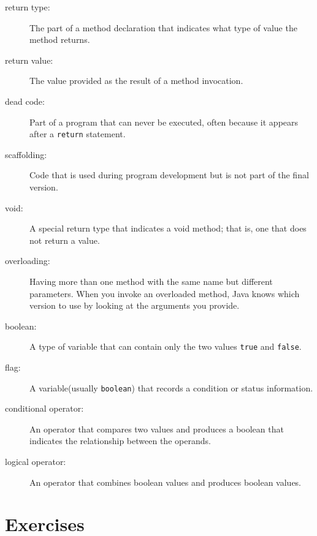 \documentclass[12pt]{book}
\theoremstyle{definition}
\begin{document}
\begin{description}

\item[return type:]  The part of a method declaration that indicates
what type of value the method returns.

\item[return value:]  The value provided as the result of a method
invocation.

\item[dead code:]  Part of a program that can never be executed,
often because it appears after a {\tt return} statement.

\item[scaffolding:]  Code that is used during program development
but is not part of the final version.

\item[void:]  A special return type that indicates a void method;
that is, one that does not return a value.

\item[overloading:]  Having more than one method with the same name
but different parameters.  When you invoke an overloaded method,
Java knows which version to use by looking at the arguments you
provide.

\item[boolean:]  A type of variable that can contain only the two
values {\tt true} and {\tt false}.

\item[flag:]  A variable(usually {\tt boolean}) that records
a condition or status information.

\item[conditional operator:]  An operator that compares two values
and produces a boolean that indicates the relationship between the
operands.

\item[logical operator:]  An operator that combines boolean values
and produces boolean values.



\end{description}


\section{Exercises}
\end{document}
